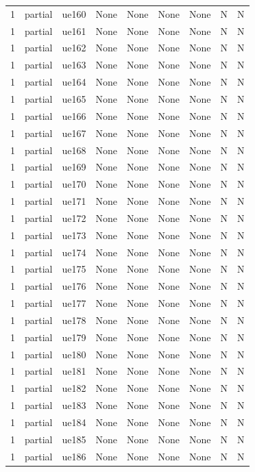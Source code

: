 \begin{table}[ht]
\begin{tabular}{|c|c|c|c|c|c|c|c|c|}
1 & partial & ue160 & None & None & None & None & N & N \\
1 & partial & ue161 & None & None & None & None & N & N \\
1 & partial & ue162 & None & None & None & None & N & N \\
1 & partial & ue163 & None & None & None & None & N & N \\
1 & partial & ue164 & None & None & None & None & N & N \\
1 & partial & ue165 & None & None & None & None & N & N \\
1 & partial & ue166 & None & None & None & None & N & N \\
1 & partial & ue167 & None & None & None & None & N & N \\
1 & partial & ue168 & None & None & None & None & N & N \\
1 & partial & ue169 & None & None & None & None & N & N \\
1 & partial & ue170 & None & None & None & None & N & N \\
1 & partial & ue171 & None & None & None & None & N & N \\
1 & partial & ue172 & None & None & None & None & N & N \\
1 & partial & ue173 & None & None & None & None & N & N \\
1 & partial & ue174 & None & None & None & None & N & N \\
1 & partial & ue175 & None & None & None & None & N & N \\
1 & partial & ue176 & None & None & None & None & N & N \\
1 & partial & ue177 & None & None & None & None & N & N \\
1 & partial & ue178 & None & None & None & None & N & N \\
1 & partial & ue179 & None & None & None & None & N & N \\
1 & partial & ue180 & None & None & None & None & N & N \\
1 & partial & ue181 & None & None & None & None & N & N \\
1 & partial & ue182 & None & None & None & None & N & N \\
1 & partial & ue183 & None & None & None & None & N & N \\
1 & partial & ue184 & None & None & None & None & N & N \\
1 & partial & ue185 & None & None & None & None & N & N \\
1 & partial & ue186 & None & None & None & None & N & N \\

\end{tabular}
\end{table}
